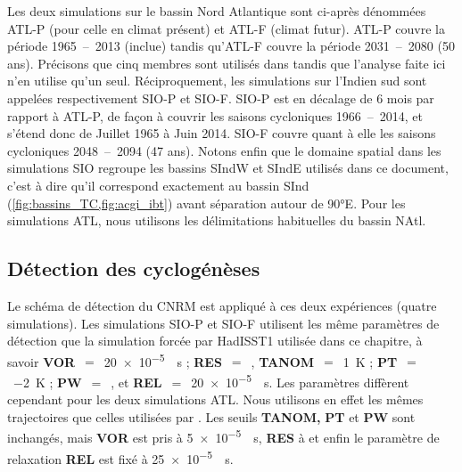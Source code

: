 \documentclass[../main.tex]{subfiles}
\begin{document}
Les deux simulations sur le bassin Nord Atlantique sont ci-après dénommées ATL-P (pour celle en climat présent) et ATL-F (climat futur). ATL-P couvre la période
\num{1965}~--~\num{2013} (inclue) tandis qu'ATL-F couvre la période \num{2031}~--~\num{2080} (50 ans). Précisons que cinq membres sont utilisés dans
\textcite{chauvin_future_2020} tandis que l'analyse faite ici n'en utilise qu'un seul. Réciproquement, les simulations sur l'Indien sud sont appelées
respectivement SIO-P et SIO-F. SIO-P est en décalage de \num{6} mois par rapport à ATL-P, de façon à couvrir les saisons cycloniques \num{1966}~--~\num{2014},
et s'étend donc de Juillet \num{1965} à Juin \num{2014}. SIO-F couvre quant à elle les saisons cycloniques \num{2048}~--~\num{2094} (47 ans). Notons enfin que
le domaine spatial dans les simulations SIO regroupe les bassins SIndW et SIndE utilisés dans ce document, c'est à dire qu'il correspond exactement au bassin
SInd (\cref{fig:bassins_TC,fig:acgi_ibt}) avant séparation autour de \ang{90}E. Pour les simulations ATL, nous utilisons les délimitations habituelles du bassin
NAtl.

\subsection{Détection des cyclogénèses}

Le schéma de détection du CNRM est appliqué à ces deux expériences (quatre simulations). Les simulations SIO-P et SIO-F utilisent les même paramètres de
détection que la simulation forcée par HadISST1 utilisée dans ce chapitre, à savoir \textbf{VOR}~$=$~\SI{20e-5}{\per\second} ; \textbf{RES}~$=$~,
\textbf{TANOM}~$=$~\SI{1}{\kelvin} ; \textbf{PT}~$=$~\SI{-2}{\kelvin} ; \textbf{PW}~$=$~, et \textbf{REL}~$=$~\SI{20e-5}{\per\second}. Les paramètres
diffèrent cependant pour les deux simulations ATL. Nous utilisons en effet les mêmes trajectoires que celles utilisées par \textcite{chauvin_future_2020}. Les
seuils \textbf{TANOM,} \textbf{PT} et \textbf{PW} sont inchangés, mais \textbf{VOR} est pris à \SI{5e-5}{\per\second}, \textbf{RES} à  et enfin le
paramètre de relaxation \textbf{REL} est fixé à \SI{25e-5}{\per\second}.
\end{document}
